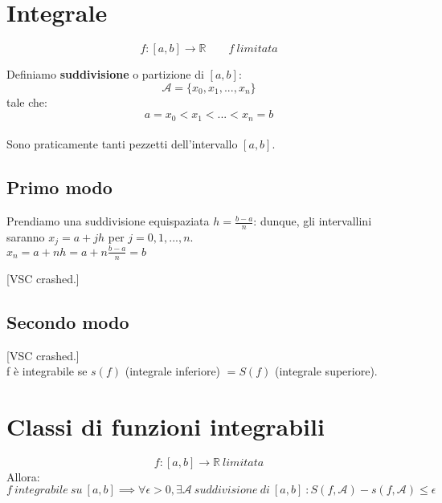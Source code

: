 \documentclass{article}
\begin{document}
\section{Integrale}

\[f : [a, b] \to \mathbb{R} \qquad f\ limitata\]

Definiamo \textbf{suddivisione} o partizione di \([a, b]\):
\[\mathcal{A} = \{ x_0, x_1, ..., x_n \}\]
tale che:
\[a = x_0 < x_1 < ... < x_n = b\]
\\
Sono praticamente tanti pezzetti dell'intervallo \([a, b]\).\\

\subsection{Primo modo}
Prendiamo una suddivisione equispaziata \(h = \frac{b - a}{n}\): dunque, gli intervallini saranno \(x_j = a + jh\) per \(j = 0, 1, ..., n\).\\
\(x_n = a + nh = a + n \frac{b - a}{n} = b\)

[VSC crashed.]\\

\subsection{Secondo modo}

[VSC crashed.]\\

f è integrabile se \(s(f)\) (integrale inferiore) \(= S(f)\) (integrale superiore).

\section{Classi di funzioni integrabili}
\[f : [a, b] \to \mathbb{R}\ limitata\]
Allora:
\(f\ integrabile\ su\ [a, b] \implies \forall \epsilon > 0, \exists \mathcal{A}\ suddivisione\ di\ [a, b]\ : S(f, \mathcal{A}) - s(f, \mathcal{A}) \leq \epsilon\)
\end{document}
